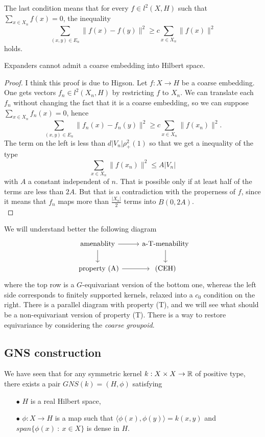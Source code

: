 The last condition means that for every $f\in l^2(X,H)$ such that $\sum_{x\in X_n} f(x)=0$, the inequality
\[\sum_{(x,y)\in E_n} \| f(x)-f(y) \|^2 \geq c \sum_{x\in X_n} \| f(x)\|^2    \]
holds.

\begin{thm}
Expanders cannot admit a coarse embedding into Hilbert space.
\end{thm}

\begin{proof} 
I think this proof is due to Higson. Let $f: X \rightarrow H$ be a coarse embedding. One gets vectors $f_n\in l^2(X_n,H)$ by restricting $f$ to $X_n$. We can translate each $f_n$ without changing the fact that it is a coarse embedding, so we can suppose $\sum_{x\in X_n} f_n(x)=0$, hence
\[\sum_{(x,y)\in E_n} \| f_n(x)-f_n(y) \|^2 \geq c \sum_{x\in X_n} \| f(x_n)\|^2.\]
The term on the left is less than $d |V_n| \rho_+^2(1)$ so that we get a inequality of the type
\[\sum_{x\in X_n} \| f(x_n)\|^2 \leq A |V_n|\]
with $A$ a constant independent of $n$. That is possible only if at least half of the terms are less than $2A$. But that is a contradiction with the properness of $f$, since it means that $f_n$ maps more than $\frac{|X_n|}{2}$ terms into $B(0,2A)$.\\	 
\end{proof}

We will understand better the following diagram
\[\begin{tikzcd}
\text{amenablity} \arrow{r}\arrow{d} & \text{a-T-menability} \arrow{d} \\
\text{ property (A)} \arrow{r} & \text{ (CEH) }  
\end{tikzcd}\]
where the top row is a $G$-equivariant version of the bottom one, whereas the left side corresponds to finitely supported kernels, relaxed into a $c_0$ condition on the right. There is a parallel diagram with property (T), and we will see what should be a non-equivariant version of property (T). There is a way to restore equivariance by considering the \textit{coarse groupoid}.

\subsection{GNS construction}

We have seen that for any symmetric kernel $k: X\times X \rightarrow \mathbb R$ of positive type, there exists a pair $GNS(k)=(H,\phi)$ satisfying
\begin{itemize}
\item[$\bullet$] $H$ is a real Hilbert space,
\item[$\bullet$] $\phi : X\rightarrow H$ is a map such that $\langle \phi(x),\phi(y) \rangle = k(x,y)$ and $span \{ \phi(x)\ : \ x\in X \} $ is dense in $H$. 
\end{itemize}

